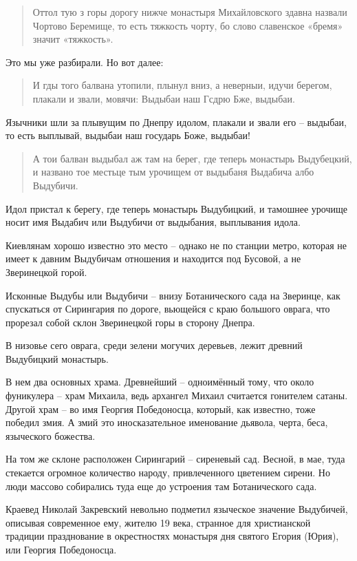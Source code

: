 \documentclass[a5paper,11pt,openany]{article}
\begin{document}
\begin{quotation}
\noindent  Оттол тую з горы дорогу нижче монастыря Михайловского здавна назвали Чортово Беремище, то есть тяжкость чорту, бо слово славенское «бремя» значит «тяжкость». \end{quotation}

Это мы уже разбирали. Но вот далее:

\begin{quotation}
\noindent  И гды того балвана утопили, плынул вниз, а неверныи, идучи берегом, плакали и звали, мовячи: Выдыбаи наш Гсдрю Бже, выдыбаи.
\end{quotation}

Язычники шли за плывущим по Днепру идолом, плакали и звали его – выдыбаи, то есть выплывай, выдыбаи наш государь Боже, выдыбаи!

\begin{quotation}
\noindent А тои балван выдыбал аж там на берег, где теперь монастырь Выдубецкий, и названо тое местьце тым урочищем от выдыбаня Выдабича албо Выдубичи.
\end{quotation}

Идол пристал к берегу, где теперь монастырь Выдубицкий, и тамошнее урочище носит имя Выдабич или Выдубичи от выдыбания, выплывания идола.

Киевлянам хорошо известно это место – однако не по станции метро, которая не имеет к давним Выдубичам отношения и находится под Бусовой, а не Зверинецкой горой.

Исконные Выдубы или Выдубичи – внизу Ботанического сада на Зверинце, как спускаться от Сирингария по дороге, вьющейся с краю большого оврага, что прорезал собой склон Зверинецкой горы в сторону Днепра.

В низовье сего оврага, среди зелени могучих деревьев, лежит древний Выдубицкий монастырь.

В нем два основных храма. Древнейший – одноимённый тому, что около фуникулера – храм Михаила, ведь архангел Михаил считается гонителем сатаны. Другой храм – во имя Георгия Победоносца, который, как известно, тоже победил змия. А змий это иносказательное именование дьявола, черта, беса, языческого божества.

На том же склоне расположен Сирингарий – сиреневый сад. Весной, в мае, туда стекается огромное количество народу, привлеченного цветением сирени. Но люди массово собирались туда еще до устроения там Ботанического сада. 

Краевед Николай Закревский невольно подметил языческое значение Выдубичей, описывая\cite{zakr01} современное ему, жителю 19 века, странное для христианской традиции празднование в окрестностях монастыря дня святого Егория (Юрия), или Георгия Победоносца.
\end{document}

